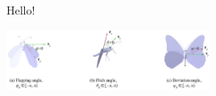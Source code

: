 \documentclass{article}
\begin{document}
Hello!

\includegraphics[width=0.5\textwidth]{Fig1_monarch_EulerAngles}
\end{document}
